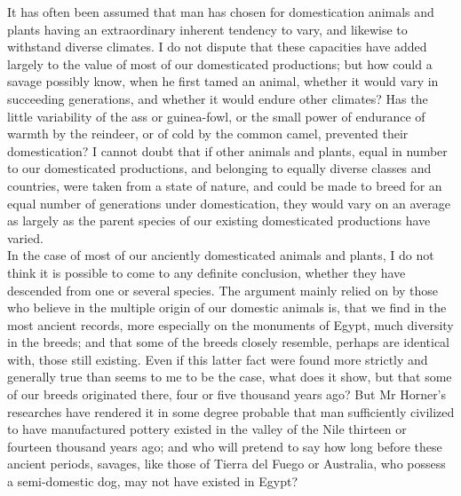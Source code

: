 \indent It has often been assumed that man has chosen for domestication animals and plants having an extraordinary inherent tendency to vary, and likewise to withstand diverse climates. I do not dispute that these capacities have added largely to the value of most of our domesticated productions; but how could a savage possibly know, when he first tamed an animal, whether it would vary in succeeding generations, and whether it would endure other climates? Has the little variability of the ass or guinea-fowl, or the small power of endurance of warmth by the reindeer, or of cold by the common camel, prevented their domestication? I cannot doubt that if other animals and plants, equal in number to our domesticated productions, and belonging to equally diverse classes and countries, were taken from a state of nature, and could be made to breed for an equal number of generations under domestication, they would vary on an average as largely as the parent species of our existing domesticated productions have varied.  \\
\indent In the case of most of our anciently domesticated animals and plants, I do not think it is possible to come to any definite conclusion, whether they have descended from one or several species.  The argument mainly relied on by those who believe in the multiple origin of our domestic animals is, that we find in the most ancient records, more especially on the monuments of Egypt, much diversity in the breeds; and that some of the breeds closely resemble, perhaps are identical with, those still existing. Even if this latter fact were found more strictly and generally true than seems to me to be the case, what does it show, but that some of our breeds originated there, four or five thousand years ago? But Mr Horner's researches have rendered it in some degree probable that man sufficiently civilized to have manufactured pottery existed in the valley of the Nile thirteen or fourteen thousand years ago; and who will pretend to say how long before these ancient periods, savages, like those of Tierra del Fuego or Australia, who possess a semi-domestic dog, may not have existed in Egypt?  \\
